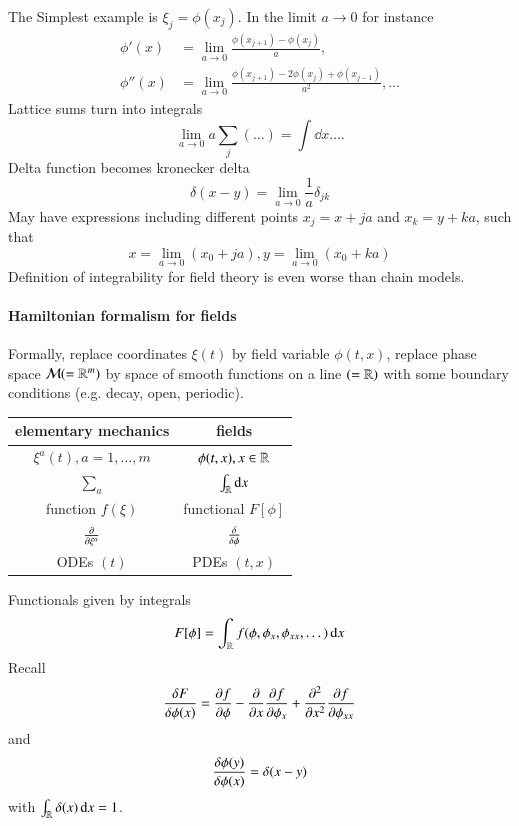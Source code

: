 The Simplest example is $\xi_j = \phi(x_j)$. In the limit $a\rightarrow 0$ for instance 
\begin{align*}
	\phi'(x) &= \lim_{a\rightarrow 0} \frac{\phi(x_{j+1}) - \phi(x_j)}{a}, \\
	\phi''(x) &= \lim_{a\rightarrow 0} \frac{\phi(x_{j+1}) - 2 \phi(x_j) + \phi(x_{j-1})}{a^2}, \dots
\end{align*}
Lattice sums turn into integrals
\begin{equation*}
	\lim_{a\rightarrow 0} a \sum_j (\dots) = \int \dd{x} \dots .
\end{equation*}
Delta function becomes kronecker delta
\begin{equation*}
	\delta(x-y) = \lim_{a\rightarrow 0} \frac{1}{a} \delta_{jk}
\end{equation*}
May have expressions including different points $x_j = x+ja$ and $x_k = y+ka$, such that 
\begin{equation*}
	x = \lim_{a\rightarrow 0} (x_0 + ja), y = \lim_{a\rightarrow 0} (x_0 + ka)
\end{equation*}
Definition of integrability for field theory is even worse than chain models.



\paragraph{Hamiltonian formalism for fields}
Formally, replace coordinates $\xi (t)$ by field variable $\phi(t, x)$, replace phase space $\mathcal{M}(=\mathbb{R}^m)$ by space of smooth functions on a line $(=\mathbb{R})$ with some boundary conditions (e.g. decay, open, periodic). 
\begin{table}[htpb]
	\centering
	\begin{tabular}{cc}
		\toprule
		elementary mechanics & fields \\
		\midrule
		$\xi^a(t), a = 1, \dots, m$ & $\phi(t, x), x\in \mathbb{R}$ \\
		$\sum_a$ & $\int_{\mathbb{R}}\dd{x}$ \\
		function $f(\xi)$ & functional $F[\phi]$ \\
		$\pdv{\xi^a}$ & $\fdv{\phi}$ \\
		ODEs $(t)$ & PDEs $(t, x)$ \\
		\bottomrule
	\end{tabular}
\end{table}

Functionals given by integrals
\begin{equation*}
	F[\phi] = \int_{\mathbb{R}} f(\phi, \phi_x, \phi_{x x }, \dots) \dd{x}
\end{equation*}
Recall 
\begin{equation*}
	\fdv{F}{\phi(x)} = \pdv{f}{\phi} - \pdv{x} \pdv{f}{\phi_x} + \pdv[2]{x} \pdv{f}{\phi_{x x}}
\end{equation*}
and 
\begin{equation*}
	\fdv{\phi(y)}{\phi(x)} = \delta(x-y)
\end{equation*}
with $\int_{\mathbb{R}} \delta(x) \dd{x} = 1$.

